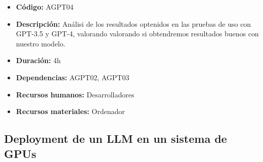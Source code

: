 \begin{itemize}
        \begin{itemize}
            \item \textbf{Código:} AGPT04
            \item \textbf{Descripción:} Análisi de los resultados optenidos en las pruebas de uso con GPT-3.5 y GPT-4, valorando
                valorando si obtendremos resultados buenos con nuestro modelo.
            \item \textbf{Duración:} 4h
            \item \textbf{Dependencias:} AGPT02, AGPT03
            \item \textbf{Recursos humanos:} Desarrolladores
            \item \textbf{Recursos materiales:} Ordenador
        \end{itemize}
\end{itemize}

\subsection{Deployment de un LLM en un sistema de GPUs}
\label{subsec:tareas_gpu}

